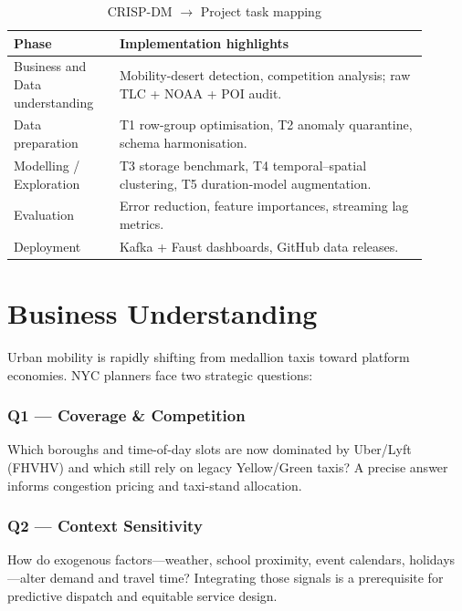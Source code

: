\documentclass[conference]{IEEEtran}
\begin{document}
\begin{table}[htbp]
  \caption{CRISP-DM \(\to\) Project task mapping}
  \label{tab:crisp}
  \centering
  \begin{tabular}{p{0.23\linewidth}p{0.67\linewidth}}
    \toprule
    \textbf{Phase} & \textbf{Implementation highlights} \\ \midrule
    Business and Data understanding &
    Mobility-desert detection, competition analysis; raw TLC + NOAA + POI audit.\\
    Data preparation &
    T1 row-group optimisation, T2 anomaly quarantine, schema harmonisation.\\
    Modelling / Exploration &
    T3 storage benchmark, T4 temporal–spatial clustering,
    T5 duration-model augmentation.\\
    Evaluation &
    Error reduction, feature importances,
    streaming lag metrics.\\
    Deployment &
    Kafka + Faust dashboards, GitHub data releases.\\
    \bottomrule
  \end{tabular}
\end{table}

\section{Business Understanding}
Urban mobility is rapidly shifting from medallion taxis toward platform
economies.  NYC planners face two strategic questions:

\subsubsection*{Q1 — Coverage \& Competition}
Which boroughs and time-of-day slots are now dominated by Uber/Lyft
(FHVHV) and which still rely on legacy Yellow/Green taxis?  A precise
answer informs congestion pricing and taxi-stand allocation.

\subsubsection*{Q2 — Context Sensitivity}
How do exogenous factors—weather, school proximity, event calendars, holidays—alter demand and travel time?
Integrating those signals is a prerequisite for predictive dispatch and equitable service design.
\end{document}
